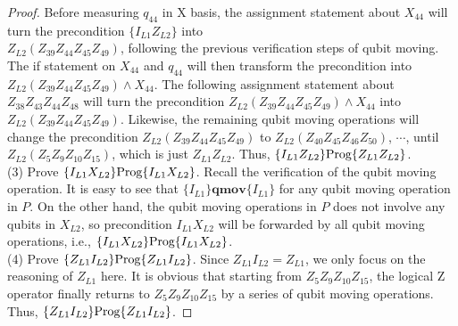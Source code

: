\begin{proof}
Before measuring $q_{44}$ in X basis, the assignment statement about $X_{44}$ will turn the precondition $\{I_{L1} Z_{L2}\}$ into \\
$Z_{L2}(Z_{39}Z_{44}Z_{45}Z_{49})$, following the previous verification steps of qubit moving. The if statement on $X_{44}$ and $q_{44}$ will then transform the precondition into $Z_{L2}(Z_{39}Z_{44}Z_{45}Z_{49}) \wedge X_{44}$. The following assignment statement about $Z_{38}Z_{43}Z_{44}Z_{48}$ will turn the precondition $Z_{L2}(Z_{39}Z_{44}Z_{45}Z_{49}) \wedge X_{44}$ into  $Z_{L2}(Z_{39}Z_{44}Z_{45}Z_{49})$. Likewise, the remaining qubit moving operations will change the precondition $Z_{L2}(Z_{39}Z_{44}Z_{45}Z_{49})$ to $Z_{L2}(Z_{40}Z_{45}Z_{46}Z_{50})$, $\cdots$, until $Z_{L2}(Z_{5}Z_{9}Z_{10}Z_{15})$, which is just $Z_{L1}Z_{L2}$. Thus, $\{I_{L1} Z_{L2}\}\text{Prog}\{Z_{L1} Z_{L2}\}$.
\\
(3) Prove $\{I_{L1} X_{L2}\}\text{Prog}\{I_{L1} X_{L2}\}$. Recall the verification of the qubit moving operation. It is easy to see that $\{I_{L1}\}\textbf{qmov}\{I_{L1}\}$ for any qubit moving operation in $P$. On the other hand, the qubit moving operations in $P$ does not involve any qubits in $X_{L2}$, so precondition $I_{L1}X_{L2}$ will be forwarded by all qubit moving operations, i.e.,
$\{I_{L1} X_{L2}\}\text{Prog}\{I_{L1} X_{L2}\}$.
\\
(4) Prove $\{Z_{L1} I_{L2}\}\text{Prog}\{Z_{L1}I_{L2}\}$. Since $Z_{L1} I_{L2} = Z_{L1}$, we only focus on the reasoning of $Z_{L1}$ here. It is obvious that starting from $Z_5Z_9Z_{10}Z_{15}$, the logical Z operator finally returns to $Z_5Z_9Z_{10}Z_{15}$ by a series of qubit moving operations. Thus, $\{Z_{L1} I_{L2}\}\text{Prog}\{Z_{L1}I_{L2}\}$.
\end{proof}

